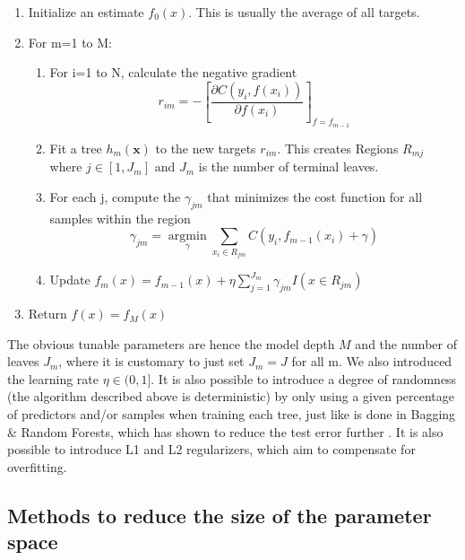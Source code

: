 \documentclass[11pt,a4paper,notitlepage]{article}
\begin{document}
\begin{enumerate}
    \item{Initialize an estimate $f_0(x)$. This is usually the average of all targets.}
    \item{For m=1 to M:}
    \begin{enumerate}
        \item{For i=1 to N, calculate the negative gradient }
        \begin{equation*}
            r_{im}=-\left[\frac{\partial C(y_i,f(x_i))}{\partial f(x_i)} \right]_{f=f_{m-1}}
        \end{equation*}
        \item{Fit a tree  $h_m(\boldsymbol{x})$ to the new targets $r_{im}$. This creates Regions $R_{mj}$ where $j\in[1,J_m]$ and $J_m$ is the number of terminal leaves.}
        \item{For each j, compute the $\gamma_{jm}$ that minimizes the cost function for all samples within the region}
            \begin{equation}
                \gamma_{jm}= \operatorname*{argmin}_{\gamma}\sum_{x_i \in {R_{jm}}} C(y_i,f_{m-1}(x_i)+\gamma)
            \end{equation}
        \item{Update $f_m(x)=f_{m-1}(x)+\eta\sum_{j=1}^{J_m}\gamma_{jm}I(x\in R_{jm})$}
    \end{enumerate}
    \item{Return $f(x)=f_M(x)$}
\end{enumerate}
The obvious tunable parameters are hence the model depth $M$ and the number of leaves $J_m$, where it is customary to just set $J_m=J$ for all m. We also introduced the learning rate $\eta\in(0,1]$. It is also possible to introduce a degree of randomness (the algorithm described above is deterministic) by only using a given percentage of predictors and/or samples when training each tree, just like is done in Bagging \& Random Forests, which has shown to reduce the test error further \citep{hastie}. It is also possible to introduce L1 and L2 regularizers, which aim to compensate for overfitting. 
\subsection{Methods to reduce the size of the parameter space}
\end{document}
